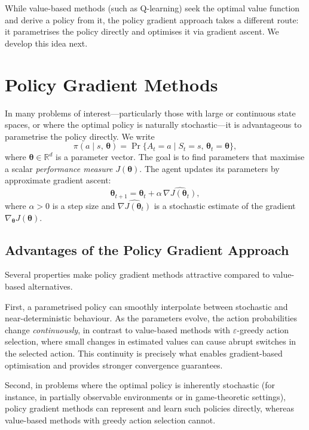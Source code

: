 \documentclass[a4paper,oneside,11pt]{report}
\begin{document}
While value-based methods (such as Q-learning) seek the optimal value function and derive a policy from it, the policy gradient approach takes a different route: it parametrises the policy directly and optimises it via gradient ascent. We develop this idea next.

\section{Policy Gradient Methods}
\label{sec:policy-gradient-methods}

In many problems of interest---particularly those with large or continuous state spaces, or where the optimal policy is naturally stochastic---it is advantageous to parametrise the policy directly. We write
\begin{equation}\label{eq:parametrised-policy}
  \pi(a \mid s,\, \bm{\theta}) = \Pr\{A_t = a \mid S_t = s,\, \bm{\theta}_t = \bm{\theta}\},
\end{equation}
where $\bm{\theta}\in\mathbb{R}^d$ is a parameter vector. The goal is to find parameters that maximise a scalar \emph{performance measure} $J(\bm{\theta})$. The agent updates its parameters by approximate gradient ascent:
\begin{equation}\label{eq:gradient-ascent}
  \bm{\theta}_{t+1} = \bm{\theta}_t + \alpha\,\widehat{\nabla J(\bm{\theta}_t)},
\end{equation}
where $\alpha>0$ is a step size and $\widehat{\nabla J(\bm{\theta}_t)}$ is a stochastic estimate of the gradient $\nabla_{\bm{\theta}} J(\bm{\theta})$.

\subsection{Advantages of the Policy Gradient Approach}
\label{subsec:pg-advantages}

Several properties make policy gradient methods attractive compared to value-based alternatives.

First, a parametrised policy can smoothly interpolate between stochastic and near-deterministic behaviour. As the parameters evolve, the action probabilities change \emph{continuously}, in contrast to value-based methods with $\varepsilon$-greedy action selection, where small changes in estimated values can cause abrupt switches in the selected action. This continuity is precisely what enables gradient-based optimisation and provides stronger convergence guarantees.

Second, in problems where the optimal policy is inherently stochastic (for instance, in partially observable environments or in game-theoretic settings), policy gradient methods can represent and learn such policies directly, whereas value-based methods with greedy action selection cannot.
\end{document}
